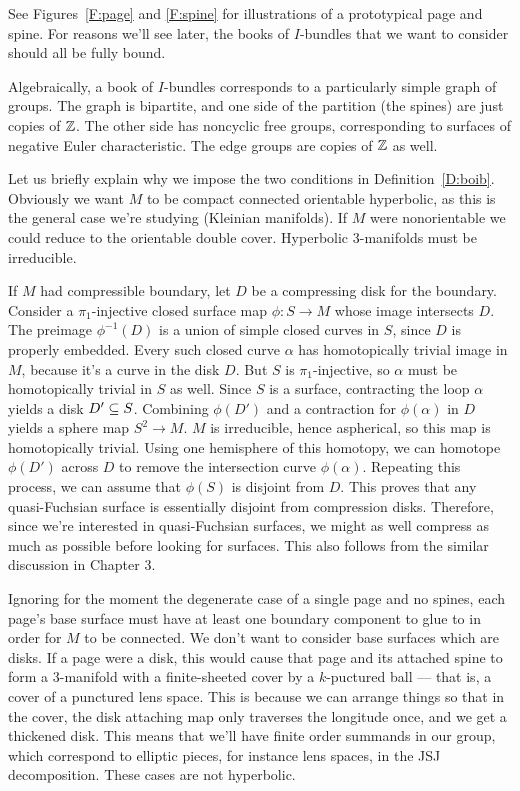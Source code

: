 See Figures~\ref{F:page} and \ref{F:spine} for illustrations of a prototypical
page and spine. For reasons we'll see later, the books of $I$-bundles that we
want to consider should all be fully bound.

Algebraically, a book of $I$-bundles corresponds to a particularly simple graph
of groups. The graph is bipartite, and one side of the partition (the spines)
are just copies of $\mathbb{Z}$. The other side has noncyclic free groups,
corresponding to surfaces of negative Euler characteristic. The edge groups are
copies of $\mathbb{Z}$ as well.

Let us briefly explain why we impose the two conditions in
Definition~\ref{D:boib}.  Obviously we want $M$ to be compact connected
orientable hyperbolic, as this is the general case we're studying (Kleinian
manifolds). If $M$ were nonorientable we could reduce to the orientable double
cover. Hyperbolic $3$-manifolds must be irreducible.

If $M$ had compressible boundary, let $D$ be a compressing disk for the
boundary.  Consider a $\pi_1$-injective closed surface map $\phi \colon S \to
M$ whose image intersects $D$. The preimage $\phi^{-1}(D)$ is a union of simple
closed curves in $S$, since $D$ is properly embedded.  Every such closed curve
$\alpha$ has homotopically trivial image in $M$, because it's a curve in the
disk $D$.  But $S$ is $\pi_1$-injective, so $\alpha$ must be homotopically
trivial in $S$ as well.  Since $S$ is a surface, contracting the loop $\alpha$
yields a disk $D'\subseteq S$. Combining $\phi(D')$ and a contraction for
$\phi(\alpha)$ in $D$ yields a sphere map $S^2 \to M$. $M$ is irreducible,
hence aspherical, so this map is homotopically trivial. Using one hemisphere of
this homotopy, we can homotope $\phi(D')$ across $D$ to remove the intersection
curve $\phi(\alpha)$. Repeating this process, we can assume that $\phi(S)$ is
disjoint from $D$. This proves that any quasi-Fuchsian surface is essentially
disjoint from compression disks.  Therefore, since we're interested in
quasi-Fuchsian surfaces, we might as well compress as much as possible before
looking for surfaces. This also follows from the similar discussion in Chapter
3.

Ignoring for the moment the degenerate case of a single page and no spines,
each page's base surface must have at least one boundary component to glue to
in order for $M$ to be connected. We don't want to consider base surfaces which
are disks.  If a page were a disk, this would cause that page and its attached
spine to form a $3$-manifold with a finite-sheeted cover by a $k$-puctured ball
--- that is, a cover of a punctured lens space. This is because we can arrange
things so that in the cover, the disk attaching map only traverses the
longitude once, and we get a thickened disk.  This means that we'll have finite
order summands in our group, which correspond to elliptic pieces, for instance
lens spaces, in the JSJ decomposition. These cases are not hyperbolic.

